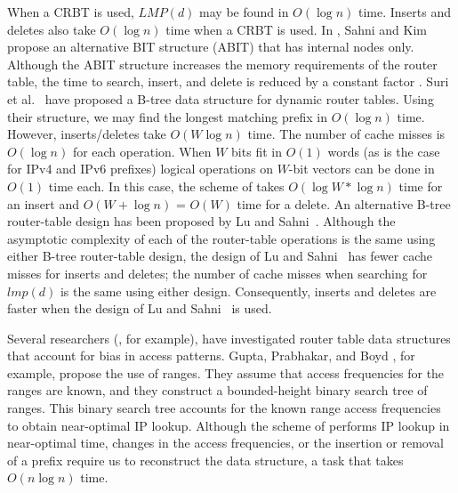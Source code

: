 When a CRBT is used, $LMP(d)$ may be found in $O(\log n)$ time.
Inserts and deletes also take $O(\log n)$ time when a CRBT is used.
In \cite{sahni4}, Sahni and Kim
propose an alternative BIT structure (ABIT)
that has internal nodes only.
Although the ABIT structure increases the memory requirements of the
router table, the time to search, insert, and delete is reduced by a
constant factor \cite{sahni4}.
Suri et al.~\cite{suri} have proposed a B-tree data structure for dynamic router
tables. Using their structure, we may find the longest matching prefix in $O(\log n)$ time.
However, inserts/deletes take $O(W\log n)$ time. The number of cache
misses is $O(\log n)$ for each operation. When $W$ bits fit in
$O(1)$ words (as is the case for IPv4 and IPv6 prefixes) logical operations
on $W$-bit vectors can be done in $O(1)$ time each.
In this case,
the scheme of \cite{suri} takes $O(\log W * \log n)$ time for an insert
and  $O(W + \log n)$ = $O(W)$ time for a delete.
An alternative B-tree router-table design has been proposed by
Lu and Sahni~\cite{lu2}. Although the asymptotic complexity of each of
the router-table operations is the same using either B-tree router-table
design, the design of Lu and Sahni~\cite{lu2} has fewer cache misses for
inserts and deletes; the number of cache misses when searching
for $lmp(d)$ is the same using either design. Consequently,
inserts and deletes are faster when the design of Lu and Sahni~\cite{lu2}
is used.


Several researchers (\cite{cheu,gupta1,ergun,sahni4}, for example),
have investigated router table data structures that account for bias in access
patterns. Gupta, Prabhakar, and Boyd \cite{gupta1}, for example,
propose the use of ranges. They assume that access frequencies for the ranges
are known, and they construct a bounded-height binary search tree of ranges.
This binary search tree accounts for the known range access frequencies to
obtain near-optimal IP lookup.
Although the scheme of \cite{gupta1} performs IP lookup in near-optimal time,
changes in the access frequencies, or the insertion or removal
of a prefix require us to reconstruct the data structure, a task that
takes $O(n\log n)$ time.


